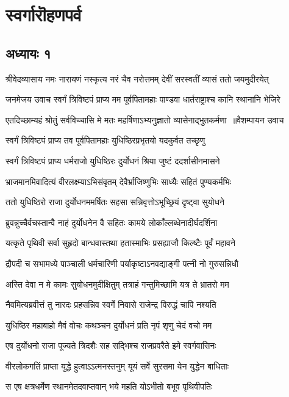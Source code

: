 \part{स्वर्गारॊहणपर्व}
\chapter{अध्यायः १}
\threelineshloka
{श्रीवेदव्यासाय नमः}
{नारायणं नस्कृत्य नरं चैव नरोत्तमम्}
{देवीं सरस्वतीं व्यासं ततो जयमुदीरयेत्}


\threelineshloka
{जनमेजय उवाच}
{स्वर्गं त्रिविष्टपं प्राप्य मम पूर्वपितामहाः}
{पाण्डवा धार्तराष्ट्राश्च कानि स्थानानि भेजिरे}


\threelineshloka
{एतदिच्छाम्यहं श्रोतुं सर्वविच्चासि मे मतः}
{महर्षिणाऽभ्यनुज्ञातो व्यासेनाद्भुतकर्मणा ॥वैशम्पायन उवाच}
{}


\twolineshloka
{स्वर्गं त्रिविष्टपं प्राप्य तव पूर्वपितामहाः}
{युधिष्ठिरप्रभृतयो यदकुर्वत तच्छृणु}


\twolineshloka
{स्वर्गं त्रिविष्टपं प्राप्य धर्मराजो युधिष्ठिरः}
{दुर्योधनं श्रिया जुष्टं ददर्शासीनमासने}


\twolineshloka
{भ्राजमानमिवादित्यं वीरलक्ष्म्याऽभिसंवृतम्}
{देवैर्भ्राजिष्णुभिः साध्यैः सहितं पुण्यकर्मभिः}


\twolineshloka
{ततो युधिष्ठिरो राजा दुर्योधनममर्षितः}
{सहसा सन्निवृत्तोऽभूच्छ्रियं दृष्ट्वा सुयोधने}


\twolineshloka
{ब्रुवन्नुच्चैर्वचस्तान्वै नाहं दुर्योधनेन वै}
{सहितः कामये लोकाँल्लब्धेनादीर्घदर्शिना}


\twolineshloka
{यत्कृते पृथिवी सर्वा सुहृदो बान्धवास्तथा}
{हतास्माभिः प्रसह्याजौ किल्ष्टैः पूर्वं महावने}


\twolineshloka
{द्रौपदी च सभामध्ये पाञ्चाली धर्मचारिणी}
{पर्याकृष्टाऽनवद्याङ्गी पत्नी नो गुरुसन्निधौ}


\twolineshloka
{अस्ति देवा न मे कामः सुयोधनमुदीक्षितुम्}
{तत्राहं गन्तुमिच्छामि यत्र ते भ्रातरो मम}


\twolineshloka
{नैवमित्यब्रवीत्तं तु नारदः प्रहसन्निव}
{स्वर्गे निवासे राजेन्द्र विरुद्धं चापि नश्यति}


\twolineshloka
{युधिष्ठिर महाबाहो मैवं वोचः कथञ्चन}
{दुर्योधनं प्रति नृपं शृणु चेदं वचो मम}


\threelineshloka
{एष दुर्योधनो राजा पूज्यते त्रिदशैः सह}
{सद्भिश्च राजप्रवरैते इमे स्वर्गवासिनः}
{}


\twolineshloka
{वीरलोकगतिं प्राप्ता युद्धे हुत्वाऽऽत्मनस्तनुम्}
{यूयं सर्वे सुरसमा येन युद्धेन बाधिताः}


\twolineshloka
{स एष क्षत्रधर्मेण स्थानमेतदवाप्तवान्}
{भये महति योऽभीतो बभूव पृथिवीपतिः}


